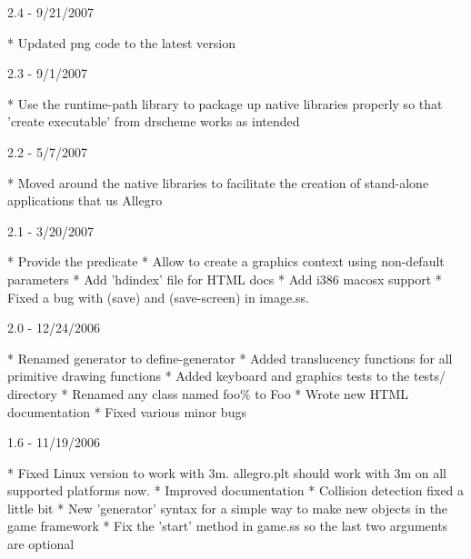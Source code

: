2.4 - 9/21/2007

* Updated png code to the latest version

2.3 - 9/1/2007

* Use the runtime-path library to package up native libraries properly so that 'create executable' from drscheme works as intended\newline

2.2 - 5/7/2007

* Moved around the native libraries to facilitate the creation of stand-alone applications that us Allegro\newline

2.1 - 3/20/2007

* Provide the  predicate\newline
* Allow  to create a graphics context using non-default parameters\newline
* Add 'hdindex' file for HTML docs\newline
* Add i386 macosx support\newline
* Fixed a bug with (save) and (save-screen) in image.ss.\newline

2.0 - 12/24/2006

* Renamed generator to define-generator\newline
* Added translucency functions for all primitive drawing functions\newline
* Added keyboard and graphics tests to the tests/ directory\newline
* Renamed any class named foo\% to Foo\newline
* Wrote new HTML documentation\newline
* Fixed various minor bugs\newline

1.6 - 11/19/2006

* Fixed Linux version to work with 3m. allegro.plt should work with 3m on all\newline
supported platforms now.\newline
* Improved documentation\newline
* Collision detection fixed a little bit\newline
* New 'generator' syntax for a simple way to make new objects in the game\newline
framework\newline
* Fix the 'start' method in game.ss so the last two arguments are optional\newline

